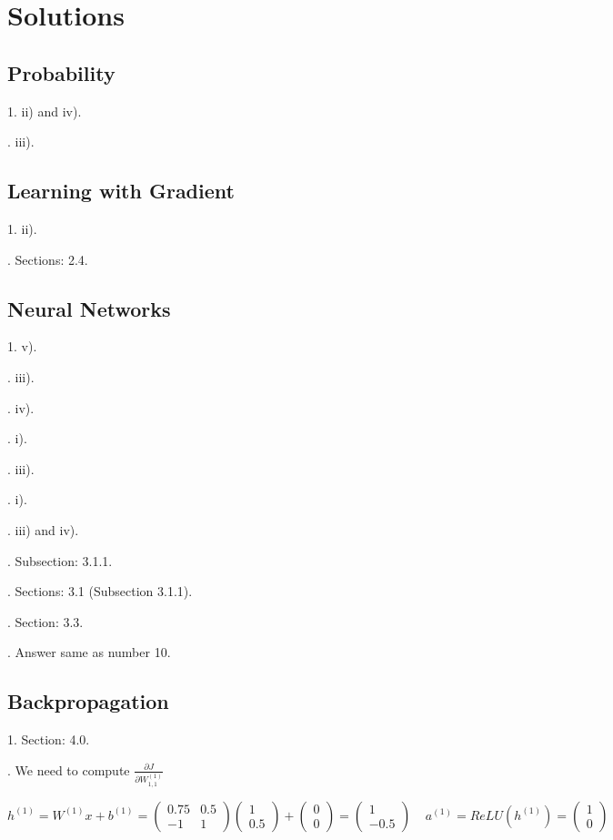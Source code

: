 \chapter{Solutions}

\section{Probability}

1. ii) and iv).

. iii).

\section{Learning with Gradient}

1. ii).

. Sections: 2.4.

\section{Neural Networks}

1. v). 

. iii).

. iv).

. i).

. iii).

. i).

. iii) and iv).

. Subsection: 3.1.1. 

. Sections: 3.1 (Subsection 3.1.1).

. Section: 3.3. 

. Answer same as number 10.

\newpage
\section{Backpropagation}

1. Section: 4.0. 

. We need to compute $ \frac{\partial J}{\partial W_{1, 1}^{(1)}}$


$$ h^{(1)} = W^{(1)}x + b^{(1)} = \begin{pmatrix} 0.75 & 0.5 \\ -1 & 1  \end{pmatrix} \begin{pmatrix} 1 \\ 0.5 \end{pmatrix} + \begin{pmatrix} 0 \\ 0 \end{pmatrix} = \begin{pmatrix} 1 \\ -0.5 \end{pmatrix} ~~~~~  a^{(1)} = ReLU (h^{(1)}) = \begin{pmatrix} 1 \\ 0 \end{pmatrix} $$

